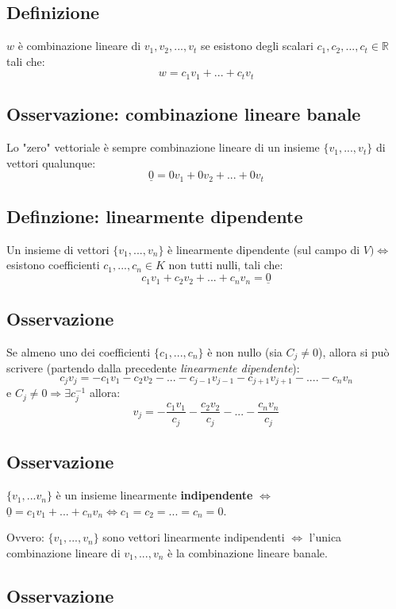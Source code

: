 \subsection{Definizione}

\(w\) è combinazione lineare di \(v_1,v_2,...,v_t\) se esistono degli scalari \(c_1,c_2,...,c_t\in\mathbb{R}\) tali che:
\[w=c_1v_1+...+c_tv_t\]

\subsection{Osservazione: combinazione lineare banale}
Lo "zero" vettoriale è sempre combinazione lineare di un insieme \(\{v_1,...,v_t\}\) di vettori qualunque:
\[\underline{0}=0v_1+0v_2+...+0v_t\]

\subsection{Definzione: linearmente dipendente}
Un insieme di vettori \(\{v_1,...,v_n\}\) è linearmente dipendente (sul campo di \(V)\Leftrightarrow\) esistono coefficienti \(c_1,...,c_n\in K\) non tutti nulli, tali che:
\[c_1v_1+c_2v_2+...+c_nv_n=\underline{0}\]

\subsection{Osservazione}
Se almeno uno dei coefficienti \(\{c_1,...,c_n\}\) è non nullo (sia \(C_j\neq 0\)), allora si può scrivere (partendo dalla precedente \textit{linearmente dipendente}):
\[c_jv_j=-c_1v_1-c_2v_2-...-c_{j-1}v_{j-1}-c_{j+1}v_{j+1}-....-c_nv_n\]
e \(C_j\neq 0\Rightarrow \exists c_j^{-1}\) allora:
\[v_j=-\frac{c_1v_1}{c_j}-\frac{c_2v_2}{c_j}-...-\frac{c_nv_n}{c_j}\]

\subsection{Osservazione}
\(\{v_1,...v_n\}\) è un insieme linearmente \textbf{indipendente} \(\Leftrightarrow\) \(\underline{0}=c_1v_1+...+c_nv_n\Leftrightarrow c_1=c_2=...=c_n=0\).

Ovvero: \(\{v_1,...,v_n\}\) sono vettori linearmente indipendenti \(\Leftrightarrow\) l'unica combinazione lineare di \(v_1,...,v_n\) è la combinazione lineare banale.

\subsection{Osservazione}

